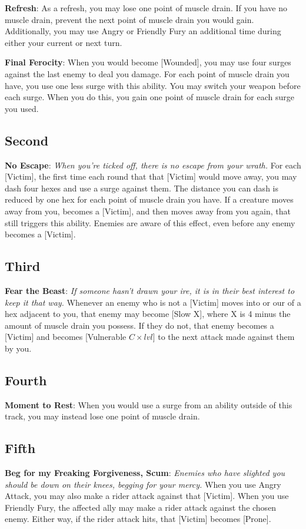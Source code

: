 \begin{multicols*}{2}
\textbf{Refresh}: As a refresh, you may lose one point of muscle drain. If you have no muscle drain, prevent the next point of muscle drain you would gain. Additionally, you may use Angry or Friendly Fury an additional time during either your current or next turn.

\textbf{Final Ferocity}: When you would become [Wounded], you may use four surges against the last enemy to deal you damage. For each point of muscle drain you have, you use one less surge with this ability. You may switch your weapon before each surge. When you do this, you gain one point of muscle drain for each surge you used.

\subsection*{Second \Facet\perk}
\textbf{No Escape}: \emph{When you're ticked off, there is no escape from your wrath.} For each [Victim], the first time each round that that [Victim] would move away, you may dash four hexes and use a surge against them. The distance you can dash is reduced by one hex for each point of muscle drain you have. If a creature moves away from you, becomes a [Victim], and then moves away from you again, that still triggers this ability. Enemies are aware of this effect, even before any enemy becomes a [Victim].

\subsection*{Third \Facet\perk}
\textbf{Fear the Beast}: \emph{If someone hasn't drawn your ire, it is in their best interest to keep it that way.} Whenever an enemy who is not a [Victim] moves into or our of a hex adjacent to you, that enemy may become [Slow X], where X is 4 minus the amount of muscle drain you possess. If they do not, that enemy becomes a [Victim] and becomes [Vulnerable $C\times lvl$] to the next attack made against them by you.

\subsection*{Fourth \Facet\perk}
\textbf{Moment to Rest}: When you would use a surge from an ability outside of this track, you may instead lose one point of muscle drain.

\subsection*{Fifth \Facet\perk}
\textbf{Beg for my Freaking Forgiveness, Scum}: \emph{Enemies who have slighted you should be down on their knees, begging for your mercy.} When you use Angry Attack, you may also make a rider attack against that [Victim]. When you use Friendly Fury, the affected ally may make a rider attack against the chosen enemy. Either way, if the rider attack hits, that [Victim] becomes [Prone].


\end{multicols*}
